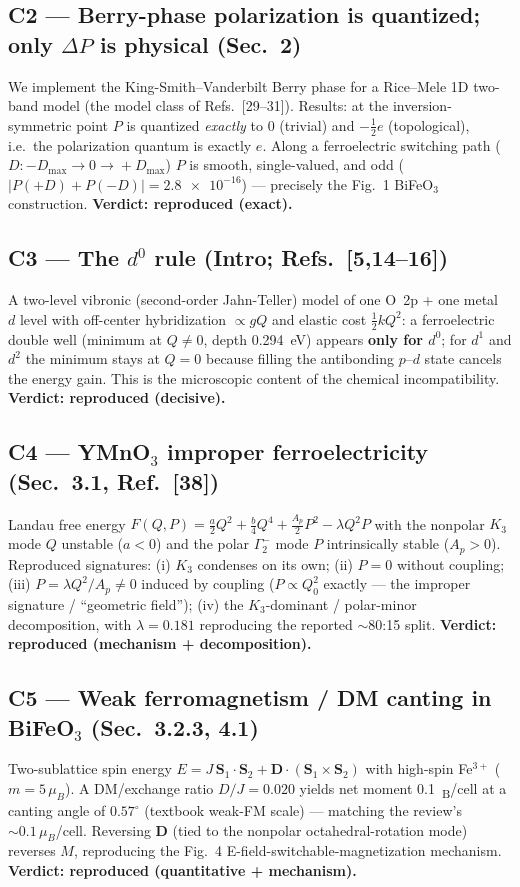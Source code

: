 \documentclass[11pt]{article}
\begin{document}
\subsection*{C2 --- Berry-phase polarization is quantized; only $\Delta P$ is physical (Sec.~2)}
We implement the King-Smith--Vanderbilt Berry phase for a Rice--Mele 1D two-band model
(the model class of Refs.~[29--31]). Results: at the inversion-symmetric point $P$ is
quantized \emph{exactly} to $0$ (trivial) and $-\tfrac12 e$ (topological), i.e.\ the
polarization quantum is exactly $e$. Along a ferroelectric switching path
($D:-D_{\max}\!\to\!0\!\to\!+D_{\max}$) $P$ is smooth, single-valued, and odd
($|P(+D)+P(-D)|=\num{2.8e-16}$) --- precisely the Fig.~1 BiFeO$_3$ construction.
\textbf{Verdict: reproduced (exact).}

\subsection*{C3 --- The $d^0$ rule (Intro; Refs.~[5,14--16])}
A two-level vibronic (second-order Jahn-Teller) model of one O~2p + one metal~$d$
level with off-center hybridization $\propto gQ$ and elastic cost $\tfrac12 kQ^2$:
a ferroelectric double well (minimum at $Q\neq0$, depth \SI{0.294}{eV}) appears
\textbf{only for $d^0$}; for $d^1$ and $d^2$ the minimum stays at $Q=0$ because filling
the antibonding $p$--$d$ state cancels the energy gain. This is the microscopic
content of the chemical incompatibility. \textbf{Verdict: reproduced (decisive).}

\subsection*{C4 --- YMnO$_3$ improper ferroelectricity (Sec.~3.1, Ref.~[38])}
Landau free energy $F(Q,P)=\tfrac{a}{2}Q^2+\tfrac{b}{4}Q^4+\tfrac{A_p}{2}P^2-\lambda
Q^2P$ with the nonpolar $K_3$ mode $Q$ unstable ($a<0$) and the polar $\Gamma_2^-$ mode
$P$ intrinsically stable ($A_p>0$). Reproduced signatures: (i) $K_3$ condenses on its
own; (ii) $P=0$ without coupling; (iii) $P=\lambda Q^2/A_p\neq0$ induced by coupling
($P\propto Q_0^2$ exactly --- the improper signature / ``geometric field''); (iv) the
$K_3$-dominant / polar-minor decomposition, with $\lambda=0.181$ reproducing the
reported $\sim$80:15 split. \textbf{Verdict: reproduced (mechanism + decomposition).}

\subsection*{C5 --- Weak ferromagnetism / DM canting in BiFeO$_3$ (Sec.~3.2.3, 4.1)}
Two-sublattice spin energy $E=J\,\mathbf S_1\!\cdot\!\mathbf S_2+\mathbf
D\!\cdot\!(\mathbf S_1\!\times\!\mathbf S_2)$ with high-spin Fe$^{3+}$ ($m=5\,\mu_B$).
A DM/exchange ratio $D/J=0.020$ yields net moment \SI{0.1}{\mu_B/cell} at a canting
angle of $0.57^\circ$ (textbook weak-FM scale) --- matching the review's
$\sim\!0.1\,\mu_B$/cell. Reversing $\mathbf D$ (tied to the nonpolar octahedral-rotation
mode) reverses $M$, reproducing the Fig.~4 E-field-switchable-magnetization mechanism.
\textbf{Verdict: reproduced (quantitative + mechanism).}
\end{document}
